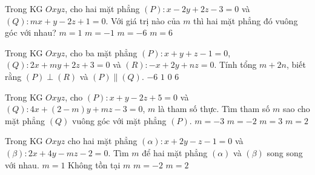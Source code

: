 \begin{ex}%
	Trong KG $Oxyz$, cho hai mặt phẳng $(P)\colon x-2y+2z-3=0$ và $(Q)\colon mx+y-2z+1=0$. Với giá trị nào của $m$ thì hai mặt phẳng đó vuông góc với nhau?
	\choice
	{$m=1$}
	{$m=-1$}
	{$m=-6$}
	{\True $m=6$}
\end{ex}

\begin{ex}%
	Trong KG $Oxyz$, cho ba mặt phẳng $(P)\colon x+y+z-1=0$, $(Q)\colon 2x+my+2z+3=0$ và $(R)\colon -x+2y+nz=0$. Tính tổng $m+2n$, biết rằng $(P)\perp (R)$ và $(P)\parallel (Q)$.
	\choice
	{$-6$}
	{$1$}
	{\True $0$}
	{$6$}
\end{ex}

\begin{ex}%
	Trong KG $Oxyz$, cho $(P)\colon x+y-2z+5=0$ và $(Q)\colon 4x+(2-m)y+mz-3=0$, $m$ là tham số thực. Tìm tham số $m$ sao cho mặt phẳng $(Q)$ vuông góc với mặt phẳng $(P)$.
	\choice
	{$m=-3$}
	{$m=-2$}
	{$m=3$}
	{\True $m=2$}
\end{ex}

\begin{ex}%
	Trong KG $Oxyz$ cho hai mặt phẳng $(\alpha)\colon x+2y-z-1=0$ và $(\beta)\colon 2x+4y-mz-2=0$. Tìm $m$ để hai mặt phẳng $(\alpha)$ và $(\beta)$ song song với nhau.
	\choice
	{$m=1$}
	{\True Không tồn tại $m$}
	{$m=-2$}
	{$m=2$}
\end{ex}

